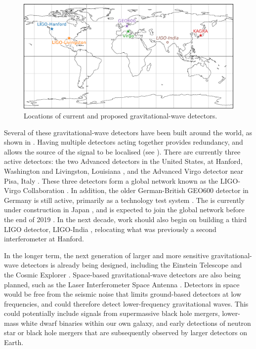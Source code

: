 \begin{colsection}
\begin{figure}[t]
    \begin{center}
        \includegraphics[width=0.95\linewidth]{images/global.pdf}
    \end{center}
    \caption[Locations of gravitational-wave detectors]{
        Locations of current and proposed gravitational-wave detectors.
        }\label{fig:global}
\end{figure}

Several of these gravitational-wave detectors have been built around the world, as shown in . Having multiple detectors acting together provides redundancy, and allows the source of the signal to be localised (see ). There are currently three active detectors: the two Advanced  detectors in the United States, at Hanford, Washington and Livingston, Louisiana \citep{LIGO}, and the  Advanced Virgo detector near Pisa, Italy \citep{Virgo}. These three detectors form a global network known as the LIGO-Virgo Collaboration  \citep[LVC,][]{LIGO-Virgo}. In addition, the older German-British GEO600 detector in Germany is still active, primarily as a technology test system \citep{GEO600}. The  is currently under construction in Japan \citep{KAGRA}, and is expected to join the global network before the end of 2019 \citep{LIGO-Virgo-KAGRA}. In the next decade, work should also begin on building a third LIGO detector, LIGO-India \citep{LIGO_India}, relocating what was previously a second interferometer at Hanford.

In the longer term, the next generation of larger and more sensitive gravitational-wave detectors is already being designed, including the Einstein Telescope \citep{EinsteinTelescope} and the Cosmic Explorer \citep{CosmicExplorer}. Space-based gravitational-wave detectors are also being planned, such as the Laser Interferometer Space Antenna  \citep[LISA,][]{LISA}. Detectors in space would be free from the seismic noise that limits ground-based detectors at low frequencies, and could therefore detect lower-frequency gravitational waves. This could potentially include signals from supermassive black hole mergers, lower-mass white dwarf binaries within our own galaxy, and early detections of neutron star or black hole mergers that are subsequently observed by larger detectors on Earth.

\newpage

\end{colsection}


